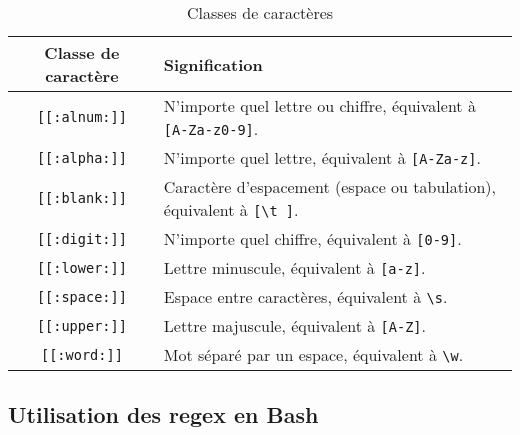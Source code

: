 \begin{table}[h!]
    \centering
    \begin{tabularx}{\textwidth}{| c | X |}
        \hline
        \textbf{Classe de caractère}& \textbf{Signification}                                                                    \\
            \hline
        \texttt{[[:alnum:]]}        & N'importe quel lettre ou chiffre, équivalent à \texttt{[A-Za-z0-9]}.                      \\
            \hline
        \texttt{[[:alpha:]]}        & N'importe quel lettre, équivalent à \texttt{[A-Za-z]}.                                    \\
            \hline
        \texttt{[[:blank:]]}        & Caractère d'espacement (espace ou tabulation), équivalent à \texttt{[\textbackslash t ]}. \\
            \hline
        \texttt{[[:digit:]]}        & N'importe quel chiffre, équivalent à \texttt{[0-9]}.                                      \\
            \hline
        \texttt{[[:lower:]]}        & Lettre minuscule, équivalent à \texttt{[a-z]}.                                            \\
            \hline
        \texttt{[[:space:]]}        & Espace entre caractères, équivalent à \texttt{\textbackslash s}.                          \\
            \hline      
        \texttt{[[:upper:]]}        & Lettre majuscule, équivalent à \texttt{[A-Z]}.                                            \\
            \hline
        \texttt{[[:word:]]}         & Mot séparé par un espace, équivalent à \texttt{\textbackslash w}.                         \\
        \hline
    \end{tabularx}
    {\addtolength{\parskip}{-13mm}\caption{Classes de caractères}\label{tab:charclass}}
\end{table}

\vspace{-11mm}
\subsection{Utilisation des regex en Bash}


